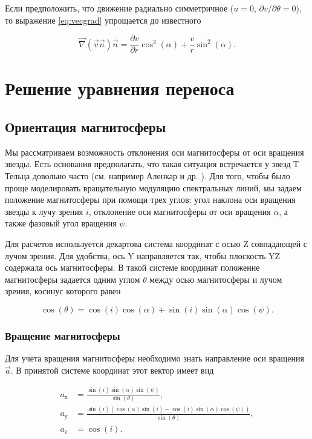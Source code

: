 \documentclass[12pt]{article}
\begin{document}
Если предположить, что движение радиально симметричное ($u = 0$, $\partial v/\partial \theta = 0$), то выражение \eqref{eq:vecgrad} упрощается до известного

\[
\vec{\nabla}(\vec{v}\vec{n})\vec{n} = \frac{\partial v}{\partial r}\cos^2(\alpha) + \frac{v}{r}\sin^2(\alpha).
\] 

\section{Решение уравнения переноса}
\subsection{Ориентация магнитосферы}

Мы рассматриваем возможность отклонения оси магнитосферы от оси вращения звезды. Есть основания предполагать, что такая ситуация встречается у звезд Т Тельца довольно часто (см. например Аленкар и др. \cite{alencar18}). Для того, чтобы было проще моделировать вращательную модуляцию спектральных линий, мы задаем положение магнитосферы при помощи трех углов: угол наклона оси вращения звезды к лучу зрения $i$, отклонение оси магнитосферы от оси вращения $\alpha$, а также фазовый угол вращения $\psi$.

Для расчетов используется декартова система координат с осью Z совпадающей с лучом зрения. Для удобства, ось Y направляется так, чтобы плоскость YZ содержала ось магнитосферы. В такой системе координат положение магнитосферы задается одним углом $\theta$ между осью магнитосферы и лучом зрения, косинус которого равен

\begin{equation} \label{eq:costet}
\cos(\theta) = \cos(i)\cos(\alpha) + \sin(i)\sin(\alpha)\cos(\psi).
\end{equation}

\subsubsection{Вращение магнитосферы}

Для учета вращения магнитосферы необходимо знать направление оси вращения $\vec{a}$. В принятой системе координат этот вектор имеет вид

\begin{align} \label{eq:rotaxis}
a_\text{x} & = \frac{\sin(i)\sin(\alpha)\sin(\psi)}{\sin(\theta)}, \nonumber \\ 
a_\text{y} & = \frac{\sin(i)(\cos(\alpha)\sin(i) - \cos(i)\sin(\alpha)\cos(\psi))}{\sin(\theta)}, \nonumber \\ 
a_\text{z} & = \cos(i).
\end{align}
\end{document}
